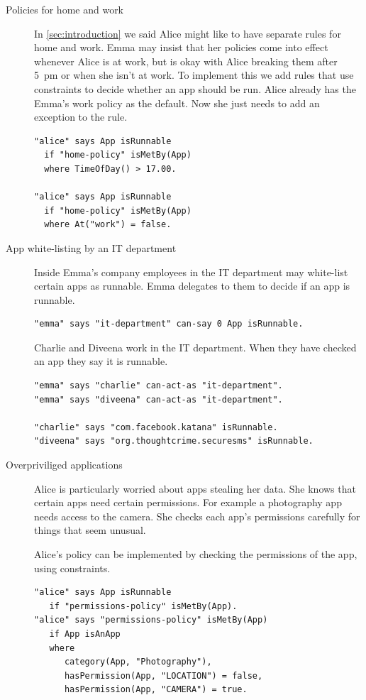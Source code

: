 \documentclass[]{scrartcl}
\begin{document}
\begin{description}
  \item[Policies for home and work]
    In \autoref{sec:introduction} we said Alice might like to have separate rules for home and work.
    Emma may insist that her policies come into effect whenever Alice is at work, but is okay with Alice breaking them after 5~pm or when she isn't at work.
    To implement this we add rules that use constraints to decide whether an app should be run.
    Alice already has the Emma's work policy as the default.
    Now she just needs to add an exception to the rule.
    \begin{lstlisting}
"alice" says App isRunnable
  if "home-policy" isMetBy(App)
  where TimeOfDay() > 17.00.

"alice" says App isRunnable
  if "home-policy" isMetBy(App)
  where At("work") = false.
    \end{lstlisting}

  \item[App white-listing by an IT department]
    Inside Emma's company employees in the IT department may white-list certain apps as runnable.
    Emma delegates to them to decide if an app is runnable.
    \begin{lstlisting}
"emma" says "it-department" can-say 0 App isRunnable.
    \end{lstlisting}
    Charlie and Diveena work in the IT department.
    When they have checked an app they say it is runnable.
    \begin{lstlisting}
"emma" says "charlie" can-act-as "it-department".
"emma" says "diveena" can-act-as "it-department".

"charlie" says "com.facebook.katana" isRunnable.
"diveena" says "org.thoughtcrime.securesms" isRunnable.
    \end{lstlisting}

  \item[Overpriviliged applications]
    Alice is particularly worried about apps stealing her data.
    She knows that certain apps need certain permissions.
    For example a photography app needs access to the camera.
    She checks each app's permissions carefully for things that seem unusual.

    Alice's policy can be implemented by checking the permissions of the app, using constraints.
    \begin{lstlisting}
"alice" says App isRunnable
   if "permissions-policy" isMetBy(App).
"alice" says "permissions-policy" isMetBy(App)
   if App isAnApp
   where
      category(App, "Photography"),
      hasPermission(App, "LOCATION") = false,
      hasPermission(App, "CAMERA") = true.
    \end{lstlisting}


\end{description}
\end{document}
